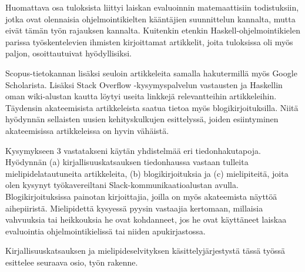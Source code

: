 Huomattava osa tuloksista liittyi laiskan evaluoinnin matemaattisiin todistuksiin, jotka ovat olennaisia ohjelmointikielten kääntäjien suunnittelun kannalta, mutta eivät tämän työn rajauksen kannalta. Kuitenkin etenkin Haskell-ohjelmointikielen parissa työskentelevien ihmisten kirjoittamat artikkelit, joita tuloksissa oli myös paljon, osoittautuivat hyödyllisiksi.

Scopus-tietokannan lisäksi seuloin artikkeleita samalla hakutermillä myös Google Scholarista. Lisäksi Stack Overflow -kysymyspalvelun vastausten ja Haskellin oman wiki-alustan kautta löytyi useita linkkejä relevantteihin artikkeleihin. Täydensin akateemisista artikkeleista saatua tietoa myös blogikirjoituksilla. Niitä hyödynnän sellaisten uusien kehityskulkujen esittelyssä, joiden esiintyminen akateemisissa artikkeleissa on hyvin vähäistä.

\begin{sloppypar}
Kysymykseen 3 vastatakseni käytän yhdistelmää eri tiedonhakutapoja. Hyödynnän (a) kirjallisuuskatsauksen tiedonhaussa vastaan tulleita mielipidelatautuneita artikkeleita, (b) blogikirjoituksia ja (c) mielipiteitä, joita olen kysynyt työkavereiltani Slack-kommunikaatioalustan avulla. Blogikirjoituksissa painotan kirjoittajia, joilla on myös akateemista näyttöä aihepiiristä. Mielipidettä kysyessä pyysin vastaajia kertomaan, millaisia vahvuuksia tai heikkouksia he ovat kohdanneet, jos he ovat käyttäneet laiskaa evaluointia ohjelmointikielissä tai niiden apukirjastossa.
\end{sloppypar}

Kirjallisuuskatsauksen ja mielipideselvityksen käsittelyjärjestystä tässä työssä esittelee seuraava osio, työn rakenne.
